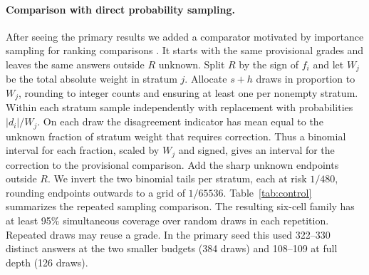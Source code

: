 \documentclass[10pt,letterpaper]{article}
\begin{document}
\paragraph{Comparison with direct probability sampling.}
After seeing the primary results we added a comparator motivated by importance sampling for ranking comparisons \cite{schnabel}. It starts with the same provisional grades and leaves the same answers outside $R$ unknown. Split $R$ by the sign of $f_i$ and let $W_j$ be the total absolute weight in stratum $j$. Allocate $s+h$ draws in proportion to $W_j$, rounding to integer counts and ensuring at least one per nonempty stratum. Within each stratum sample independently with replacement with probabilities $|d_i|/W_j$. On each draw the disagreement indicator has mean equal to the unknown fraction of stratum weight that requires correction. Thus a binomial interval for each fraction, scaled by $W_j$ and signed, gives an interval for the correction to the provisional comparison. Add the sharp unknown endpoints outside $R$. We invert the two binomial tails per stratum, each at risk $1/480$, rounding endpoints outwards to a grid of $1/65536$. Table~\ref{tab:control} summarizes the repeated sampling comparison. The resulting six-cell family has at least 95\% simultaneous coverage over random draws in each repetition. Repeated draws may reuse a grade. In the primary seed this used 322--330 distinct answers at the two smaller budgets (384 draws) and 108--109 at full depth (126 draws).
\end{document}
